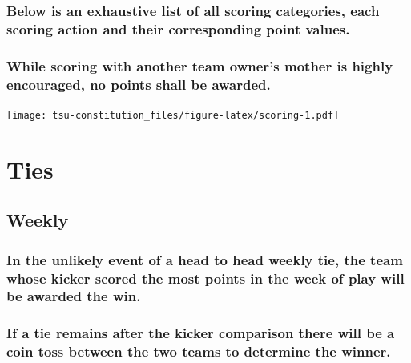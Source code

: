 \documentclass[
]{book}
\begin{document}
\hypertarget{below-is-an-exhaustive-list-of-all-scoring-categories-each-scoring-action-and-their-corresponding-point-values.}{%
\subsection{Below is an exhaustive list of all scoring categories, each scoring action and their corresponding point values.}\label{below-is-an-exhaustive-list-of-all-scoring-categories-each-scoring-action-and-their-corresponding-point-values.}}

\hypertarget{while-scoring-with-another-team-owners-mother-is-highly-encouraged-no-points-shall-be-awarded.}{%
\subsection{While scoring with another team owner's mother is highly encouraged, no points shall be awarded.}\label{while-scoring-with-another-team-owners-mother-is-highly-encouraged-no-points-shall-be-awarded.}}

\texttt{[image: tsu-constitution\_files/figure-latex/scoring-1.pdf]}

\hypertarget{ties}{%
\chapter{Ties}\label{ties}}

\hypertarget{weekly}{%
\section{Weekly}\label{weekly}}

\hypertarget{in-the-unlikely-event-of-a-head-to-head-weekly-tie-the-team-whose-kicker-scored-the-most-points-in-the-week-of-play-will-be-awarded-the-win.}{%
\subsection{In the unlikely event of a head to head weekly tie, the team whose kicker scored the most points in the week of play will be awarded the win.}\label{in-the-unlikely-event-of-a-head-to-head-weekly-tie-the-team-whose-kicker-scored-the-most-points-in-the-week-of-play-will-be-awarded-the-win.}}

\hypertarget{if-a-tie-remains-after-the-kicker-comparison-there-will-be-a-coin-toss-between-the-two-teams-to-determine-the-winner.}{%
\subsection{If a tie remains after the kicker comparison there will be a coin toss between the two teams to determine the winner.}\label{if-a-tie-remains-after-the-kicker-comparison-there-will-be-a-coin-toss-between-the-two-teams-to-determine-the-winner.}}
\end{document}
